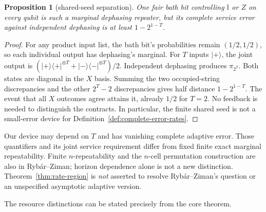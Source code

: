 \documentclass[11pt,a4paper]{article}
\numberwithin{equation}{section}
\theoremstyle{plain}
\newtheorem{proposition}[theorem]{Proposition}
\theoremstyle{definition}
\newcommand{\one}{\mathbb{I}}
\newcommand{\ket}[1]{\lvert #1 \rangle}
\newcommand{\ketbra}[2]{\lvert #1 \rangle\langle #2 \rvert}
\begin{document}
\begin{proposition}[shared-seed separation]
\label{prop:shared-seed}
One fair bath bit controlling $\one$ or $Z$ on every qubit is such a marginal
dephasing repeater, but its complete service error against independent
dephasing is at least $1-2^{1-T}$.
\end{proposition}

\begin{proof}
For any product input list, the bath bit's probabilities remain $(1/2,1/2)$,
so each individual output has dephasing's marginal. For $T$ inputs $\ket{+}$,
the joint output is
$(\ketbra{+}{+}^{\otimes T}+\ketbra{-}{-}^{\otimes T})/2$. Independent
dephasing produces $\pi_{2^T}$. Both states are diagonal in the $X$ basis.
Summing the two occupied-string discrepancies and the other $2^T-2$
discrepancies gives half distance $1-2^{1-T}$. The event that all $X$ outcomes
agree attains it, already $1/2$ for $T=2$. No feedback is needed to
distinguish the contracts. In particular, the finite shared seed is not a
small-error device for Definition~\ref{def:complete-error-rates}.
\end{proof}

Our device may depend on $T$ and has vanishing complete adaptive error. Those
quantifiers and its joint service requirement differ from fixed finite exact
marginal repeatability. Finite $n$-repeatability and the $n$-cell permutation
construction are also in Ryb\'ar--Ziman; horizon dependence alone is not a new
distinction. Theorem~\ref{thm:rate-region} is \emph{not} asserted
to resolve Ryb\'ar--Ziman's question or an unspecified asymptotic adaptive
version.

The resource distinctions can be stated precisely from the core theorem.
\end{document}
